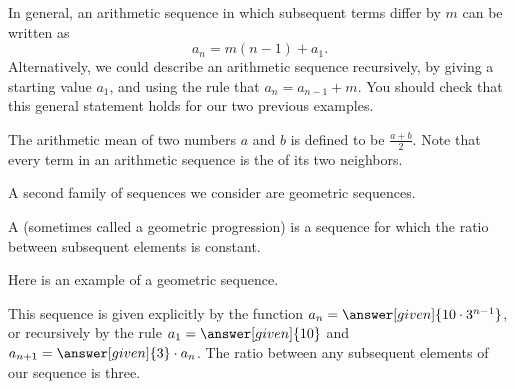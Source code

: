 \documentclass{ximera}
\begin{document}
In general, an arithmetic sequence in which subsequent terms differ
by $m$ can be written as
\[
a_n = m (n-1) + a_1.
\]
Alternatively, we could describe an arithmetic sequence recursively,
by giving a starting value $a_1$, and using the rule that $a_{n} =
a_{n-1} + m$.  You should check that this general statement holds for our 
two previous examples.


\begin{remark}
The arithmetic mean of two numbers $a$ and $b$ is defined to be $\frac{a+b}{2}$. Note that every term in an arithmetic sequence is the  of its two neighbors.  
\end{remark}



A second family of sequences we consider are geometric sequences.  

\begin{definition}
  A  (sometimes called a geometric
  progression) is a sequence for which the
  ratio between subsequent elements is constant.
\end{definition}

\begin{example}
  Here is an example of a geometric sequence.
  \begin{image}
  \end{image}
  This sequence is given explicitly by the function $a_n=\answer[given]{10\cdot
    3^{n-1}}$, or recursively by the rule $a_1 = \answer[given]{10}$ and
  $a_{n+1} = \answer[given]{3}\cdot a_n$. The ratio between any subsequent elements of our sequence is three.
\end{example}
\end{document}
